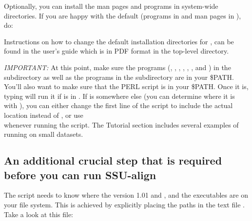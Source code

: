 Optionally, you can install the man pages and programs in system-wide
directories. If you are happy with the default (programs in
 and man pages in ),
do:


Instructions on how to change the default installation directories for
, can be found in the  user's guide
which is in  PDF format in the top-level  directory. 

\emph{IMPORTANT:}
At this point, make sure the 
programs (,  , ,
, , , and ) in
the  subdirectory as well as the  programs in
the  subdirectory are in your \$PATH\@.
You'll also want to make sure that the  PERL script is
in your \$PATH\@. Once it is, typing  will run it
if  is in . If  is somewhere
else (you can determine where it is with ), you can
either change the first line of the  script to include
the actual location instead of , or use \\
 whenever running the script. The Tutorial section
includes several examples of running  on small datasets.

\subsection{An additional crucial step that is required before you
can run SSU-align}

The   script needs to know where the
 version 1.01  and , and
the   executables are on your file
system. This is achieved by explicitly placing the paths in the text
file . Take a look at this file:


